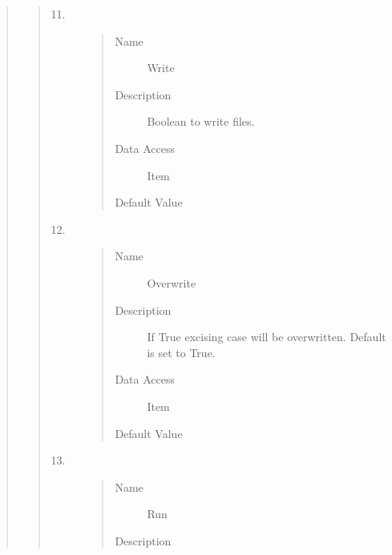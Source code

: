 \documentclass[letterpaper,10pt,english]{sphinxmanual}
\begin{document}
\begin{quote}
\begin{description}
\begin{quote}
\begin{description}
\item[{11.}] \leavevmode\begin{quote}\begin{description}
\item[{Name}] \leavevmode
Write

\item[{Description}] \leavevmode
Boolean to write files.

\item[{Data Access}] \leavevmode
Item

\item[{Default Value}] \leavevmode
{}

\end{description}\end{quote}

\item[{12.}] \leavevmode\begin{quote}\begin{description}
\item[{Name}] \leavevmode
Overwrite

\item[{Description}] \leavevmode
If True excising case will be overwritten. Default is set to True.

\item[{Data Access}] \leavevmode
Item

\item[{Default Value}] \leavevmode
{}

\end{description}\end{quote}

\item[{13.}] \leavevmode\begin{quote}\begin{description}
\item[{Name}] \leavevmode
Run

\item[{Description}] \leavevmode
{}


\end{description}
\end{quote}
\end{description}
\end{quote}
\end{description}
\end{quote}
\end{document}
